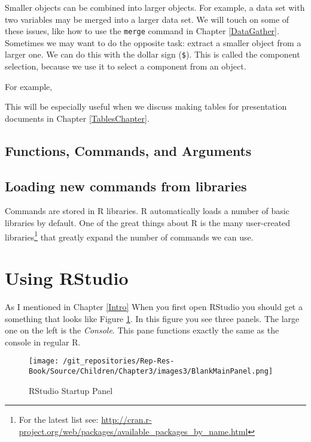 \documentclass[ChapterTOCs,krantz1]{krantz}\usepackage{graphicx, color}
\begin{document}
Smaller objects can be combined into larger objects. For example, a data set with two variables may be merged into a larger data set. We will touch on some of these issues, like how to use the {\tt{merge}} command in Chapter \ref{DataGather}. Sometimes we may want to do the opposite task: extract a smaller object from a larger one. We can do this with the dollar sign ({\tt{\$}}). This is called the component selection, because we use it to select a component from an object.

For example, 

This will be especially useful when we discuss making tables for presentation documents in Chapter \ref{TablesChapter}.

\subsection{Functions, Commands, and Arguments}

\subsection{Loading new commands from libraries}

Commands are stored in R libraries. R automatically loads a number of basic libraries by default. One of the great things about R is the many user-created libraries\footnote{For the latest list see: \url{http://cran.r-project.org/web/packages/available_packages_by_name.html}} that greatly expand the number of commands we can use. 

\section{Using RStudio}

As I mentioned in Chapter \ref{Intro} When you first open RStudio you should get a something that looks like Figure \ref{BlankMain}. In this figure you see three panels. The large one on the left is the {\emph{Console}}. This pane functions exactly the same as the console in regular R. 

\begin{figure}[ht]
    \caption{RStudio Startup Panel}
    \label{BlankMain}

    \texttt{[image: /git\_repositories/Rep-Res-Book/Source/Children/Chapter3/images3/BlankMainPanel.png]}
\end{figure}
\end{document}
